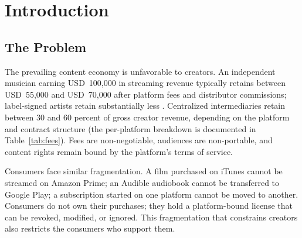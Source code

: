 
\chapter{Introduction}\label{chap:introduction}

\section{The Problem}\label{sec:the-problem}

The prevailing content economy is unfavorable to creators. An independent musician earning USD~100,000 in streaming revenue typically retains between USD~55,000 and USD~70,000 after platform fees and distributor commissions; label-signed artists retain substantially less \citep{musicBizResearch2024}. Centralized intermediaries retain between 30 and 60 percent of gross creator revenue, depending on the platform and contract structure (the per-platform breakdown is documented in Table~\ref{tab:fees}). Fees are non-negotiable, audiences are non-portable, and content rights remain bound by the platform's terms of service.

Consumers face similar fragmentation. A film purchased on iTunes cannot be streamed on Amazon Prime; an Audible audiobook cannot be transferred to Google Play; a subscription started on one platform cannot be moved to another. Consumers do not own their purchases; they hold a platform-bound license that can be revoked, modified, or ignored. This fragmentation that constrains creators also restricts the consumers who support them.

